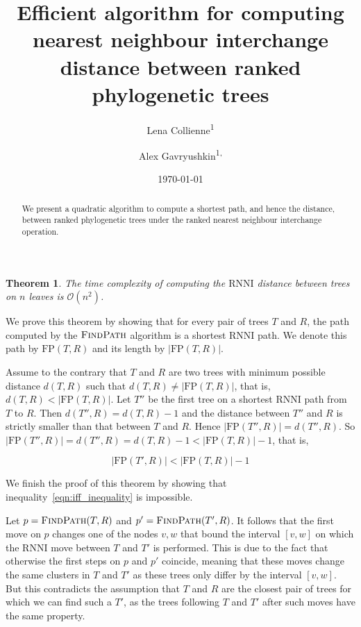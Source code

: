 \documentclass{amsart}
\title[Computing $\rnni$ distance]{Efficient algorithm for computing nearest neighbour interchange distance between ranked phylogenetic trees}
\date{\today}
\author{Lena Collienne\textsuperscript{1}}
\author{Alex Gavryushkin\textsuperscript{1, \Letter}}
\newtheorem{theorem}{Theorem}
\newcommand{\rnni}{\mathrm{RNNI}}
\newcommand{\findpath}{\textsc{FindPath}}
\newcommand{\fp}{\mathrm{FP}}
\renewcommand{\O}{\mathcal O}
\begin{document}
\begin{abstract}
We present a quadratic algorithm to compute a shortest path, and hence the distance, between ranked phylogenetic trees under the ranked nearest neighbour interchange operation.
\end{abstract}


\maketitle

\begin{theorem}
The time complexity of computing the $\rnni$ distance between trees on $n$ leaves is $\O(n^2)$.
\end{theorem}

\proof
We prove this theorem by showing that for every pair of trees $T$ and $R$, the path computed by the $\findpath$ algorithm is a shortest $\rnni$ path.
We denote this path by $\fp(T, R)$ and its length by $|\fp(T, R)|$.

Assume to the contrary that $T$ and $R$ are two trees with minimum possible distance $d(T, R)$ such that $d(T,R) \neq |\fp(T,R)|$, that is, $d(T,R) < |\fp(T,R)|$.
Let $T''$ be the first tree on a shortest $\rnni$ path from $T$ to $R$.
Then $d(T'',R) = d(T, R) - 1$ and the distance between $T''$ and $R$ is strictly smaller than that between $T$ and $R$.
Hence $|\fp(T'',R)| = d(T'', R)$.
So $|\fp(T'',R)| = d(T'', R) =  d(T, R) - 1 < |\fp(T,R)| - 1$, that is,

\begin{equation}
|\fp(T',R)| < |\fp(T,R)| - 1
\label{eqn:iff_inequality}
\end{equation}

We finish the proof of this theorem by showing that inequality~\ref{eqn:iff_inequality} is impossible.

Let $p = \findpath(T,R)$ and $p' = \findpath(T', R)$.
It follows that the first move on $p$ changes one of the nodes $v, w$ that bound the interval $[v,w]$ on which the $\rnni$ move between $T$ and $T'$ is performed.
This is due to the fact that otherwise the first steps on $p$ and $p'$ coincide, meaning that these moves change the same clusters in $T$ and $T'$ as these trees only differ by the interval $[v,w]$.
But this contradicts the assumption that $T$ and $R$ are the closest pair of trees for which we can find such a $T'$, as the trees following $T$ and $T'$ after such moves have the same property.
\end{document}

